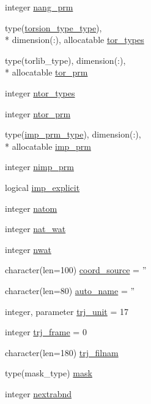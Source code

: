 \begin{DoxyCompactItemize}
integer \hyperlink{classprep_ac17ec7b95ca0f0ef40679baf2c9c0ae9}{nang\-\_\-prm}
\item 
type(\hyperlink{structprep_1_1torsion__type__type}{torsion\-\_\-type\-\_\-type}), \\*
dimension(\-:), allocatable \hyperlink{classprep_a9fcc991cb6c52982df60dcab52ddc7b9}{tor\-\_\-types}
\item 
type(torlib\-\_\-type), dimension(\-:), \\*
allocatable \hyperlink{classprep_a0a44d47429834f891ba1a0e8260f30e9}{tor\-\_\-prm}
\item 
integer \hyperlink{classprep_a1db4f2bef544894cece6f2a4f6df3d15}{ntor\-\_\-types}
\item 
integer \hyperlink{classprep_abf46f8b225b713c8e1eff53bcecdee8c}{ntor\-\_\-prm}
\item 
type(\hyperlink{structprep_1_1imp__prm__type}{imp\-\_\-prm\-\_\-type}), dimension(\-:), \\*
allocatable \hyperlink{classprep_ad5c72f6c240f7753aff7bbf36a03dbde}{imp\-\_\-prm}
\item 
integer \hyperlink{classprep_a131a8dff6c39bd140e35d19b2ee9558c}{nimp\-\_\-prm}
\item 
logical \hyperlink{classprep_a6de36f3182c32c9e273c5a54632112f7}{imp\-\_\-explicit}
\item 
integer \hyperlink{classprep_ab8dbadaf12262e9ad75d242a9d94a7be}{natom}
\item 
integer \hyperlink{classprep_a3d0b820d2bd0a7434096e0de29e2752b}{nat\-\_\-wat}
\item 
integer \hyperlink{classprep_a29b7c355a8f655a65d6589479f27f0f1}{nwat}
\item 
character(len=100) \hyperlink{classprep_a23c49c42a55467a3ef357748fb876a49}{coord\-\_\-source} = ''
\item 
character(len=80) \hyperlink{classprep_a83b69e52469478c0d64cb6bd2ad3060f}{auto\-\_\-name} = ''
\item 
integer, parameter \hyperlink{classprep_a2a8286c4c7bbbdf7837514adf40f56e8}{trj\-\_\-unit} = 17
\item 
integer \hyperlink{classprep_a67234152a914abc499cb54855d5005ce}{trj\-\_\-frame} = 0
\item 
character(len=180) \hyperlink{classprep_a92c84680f6cd6dc7868c862b571b1a01}{trj\-\_\-filnam}
\item 
type(mask\-\_\-type) \hyperlink{classprep_a847c8ade6c795111f259163203927538}{mask}
\item 
integer \hyperlink{classprep_a43c4ae861ddacd4228d5cbbb31ceed7a}{nextrabnd}

\end{DoxyCompactItemize}
